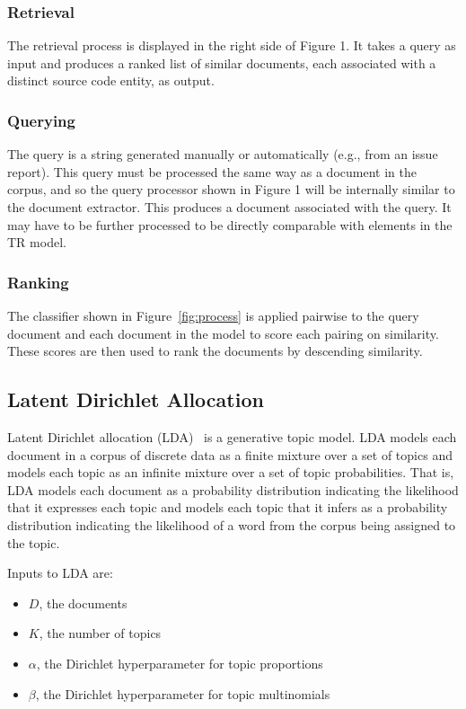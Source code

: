     \subsubsection{Retrieval}
    The retrieval process is displayed in the right side of Figure 1.
    It takes a query as input and produces a ranked list of similar documents,
    each associated with a distinct source code entity, as output.

    \subsubsection{Querying}
    The query is a string generated manually or automatically (e.g., from an issue report).
    This query must be processed the same way as a document in the corpus,
    and so the query processor shown in Figure 1 will be internally similar to the document extractor.
    This produces a document associated with the query.
    It may have to be further processed to be directly comparable with elements in the TR model.

    \subsubsection{Ranking}
    The classifier shown in Figure~\ref{fig:process} is applied pairwise to
    the query document and each document in the model
    to score each pairing on similarity.
    These scores are then used to rank the documents by descending similarity.

\subsection{Latent Dirichlet Allocation}

Latent Dirichlet allocation (LDA)~\cite{Blei2003} is a generative topic model.
LDA models each document in a corpus of discrete data as a finite mixture over a set of topics
and models each topic as an infinite mixture over a set of topic probabilities.
That is, LDA models each document as a probability distribution
indicating the likelihood that it expresses each topic and
models each topic that it infers as a probability distribution
indicating the likelihood of a word from the corpus being assigned to the topic.

Inputs to LDA are:
\begin{itemize}
\item $D$, the documents
\item $K$, the number of topics
\item $\alpha$, the Dirichlet hyperparameter for topic proportions
\item $\beta$, the Dirichlet hyperparameter for topic multinomials
\end{itemize}

